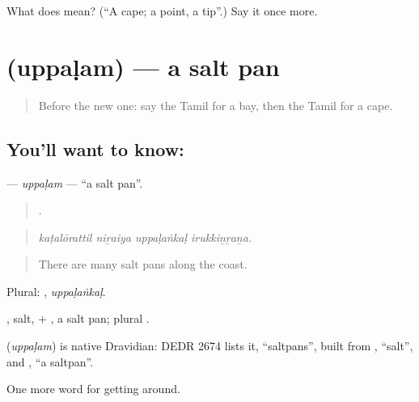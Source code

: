 \begin{tcolorbox}[breakable,colback=teal!4,colframe=teal!35!black,title={Before you move on}]
What does  mean? (\textquotedblleft{}A cape; a point, a tip\textquotedblright{}.) Say it once more.
\end{tcolorbox}
\section[\texorpdfstring{\ta{உப்பளம்} (uppaḷam)}{உப்பளம் (uppaḷam)}]{ (uppaḷam) — a salt pan}

\label{lesson:TA-C435-uppalam}



\begin{quote}
Before the new one: say the Tamil for a bay, then the Tamil for a cape.
\end{quote}

\subsection*{You'll want to know: }
\textbf{} — \emph{uppaḷam} — \textquotedblleft{}a salt pan\textquotedblright{}.

\begin{quote}
   .
\end{quote}

\begin{quote}
\emph{kaṭalōrattil niṟaiya uppaḷaṅkaḷ irukkiṉṟaṉa.}
\end{quote}

\begin{quote}
There are many salt pans along the coast.
\end{quote}

Plural: , \emph{uppaḷaṅkaḷ}.

, salt, + , a salt pan; plural .

\begin{cousinweb}
\textbf{} (\emph{uppaḷam}) is native Dravidian: DEDR 2674 lists it, \textquotedblleft{}saltpans\textquotedblright{}, built from , \textquotedblleft{}salt\textquotedblright{}, and , \textquotedblleft{}a saltpan\textquotedblright{}.
\end{cousinweb}

\begin{grammarlens}[title={What you've built}]
One more word for getting around.
\end{grammarlens}

